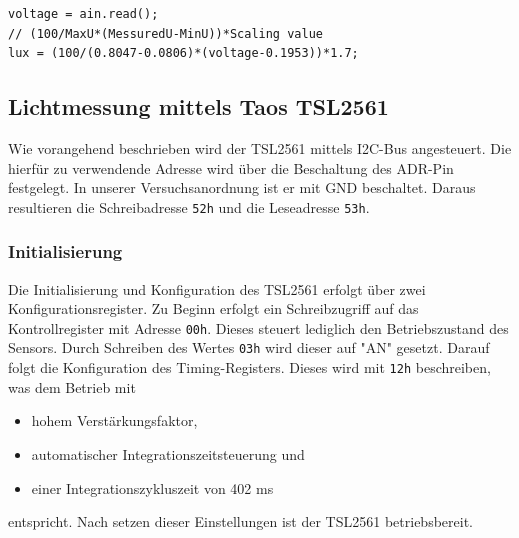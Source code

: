 \documentclass[a4paper,12pt]{scrartcl}
\begin{document}

\begin{lstlisting}[captionpos=b, caption=Berechnung der Beleuchtungsstärke mit dem GSLx, label=code:GSLx]
voltage = ain.read();
// (100/MaxU*(MessuredU-MinU))*Scaling value
lux = (100/(0.8047-0.0806)*(voltage-0.1953))*1.7;
\end{lstlisting}

\subsection{Lichtmessung mittels Taos TSL2561}
\label{sec:impTaos}
Wie vorangehend beschrieben wird der TSL2561 mittels I2C-Bus angesteuert. Die hierfür zu verwendende Adresse wird über die Beschaltung des ADR-Pin festgelegt. In unserer Versuchsanordnung ist er mit GND beschaltet. Daraus resultieren die Schreibadresse \texttt{52h} und die Leseadresse \texttt{53h}.
\subsubsection{Initialisierung}
Die Initialisierung und Konfiguration des TSL2561 erfolgt über zwei Konfigurationsregister. Zu Beginn erfolgt ein Schreibzugriff auf das Kontrollregister mit Adresse \texttt{00h}. Dieses steuert lediglich den Betriebszustand des Sensors. Durch Schreiben des Wertes \texttt{03h} wird dieser auf "AN" gesetzt. Darauf folgt die Konfiguration des Timing-Registers. Dieses wird mit \texttt{12h} beschreiben, was dem Betrieb mit
\begin{itemize}
\item hohem Verstärkungsfaktor,
\item automatischer Integrationszeitsteuerung und 
\item einer Integrationszykluszeit von 402 ms
\end{itemize}
entspricht. Nach setzen dieser Einstellungen ist der TSL2561 betriebsbereit.
\end{document}
